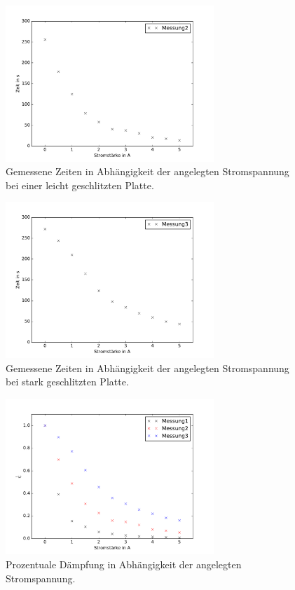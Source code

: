 \begin{frame}
  \begin{figure}
    \includegraphics[width = 0.7\textwidth]{Messung2.pdf}
    \caption{Gemessene Zeiten in Abhängigkeit der angelegten Stromspannung bei einer leicht geschlitzten Platte.}
  \end{figure}
\end{frame}

\begin{frame}
  \begin{figure}
    \includegraphics[width = 0.7\textwidth]{Messung3.pdf}
    \caption{Gemessene Zeiten in Abhängigkeit der angelegten Stromspannung bei stark geschlitzten Platte.}
  \end{figure}
\end{frame}

\begin{frame}
  \begin{figure}
    \includegraphics[width = 0.7\textwidth]{Kombiniert_gestaucht.pdf}
    \caption{Prozentuale Dämpfung in Abhängigkeit der angelegten Stromspannung.}
  \end{figure}
\end{frame}

